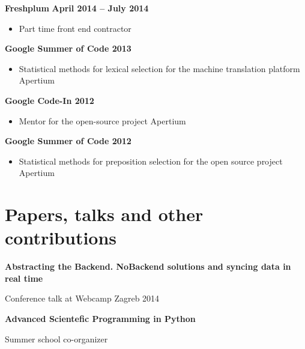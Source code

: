 \documentclass[margin,line]{resume}
\begin{document}
\begin{resume}
    \textbf{Freshplum} \vspace{1mm} \hfill \textbf{ April 2014 -- July 2014 }
    \begin{itemize}
      \item Part time front end contractor
            \vspace{-1mm}
    \end{itemize}

    \textbf{Google Summer of Code 2013} \vspace{1mm}
    \begin{itemize}
      \item Statistical methods for lexical selection for the machine translation platform Apertium
            \vspace{-1mm}
    \end{itemize}

    \textbf{Google Code-In 2012} \vspace{1mm}
    \begin{itemize}
      \item Mentor for the open-source project Apertium \vspace{-1mm}
    \end{itemize}

    \textbf{Google Summer of Code 2012} \vspace{1mm}
    \begin{itemize}
      \item Statistical methods for preposition selection for the open source project Apertium \vspace{-1mm}
    \end{itemize}
    \section{\mysidestyle Papers, talks and other contributions}

    \textbf{Abstracting the Backend. NoBackend solutions and syncing data in real time}
    \begin{list2}
    \item Conference talk at Webcamp Zagreb 2014
    \end{list2}

    \textbf{Advanced Scientefic Programming in Python}
    \begin{list2}
    \item Summer school co-organizer
    \end{list2}
    

\end{resume}
\end{document}
